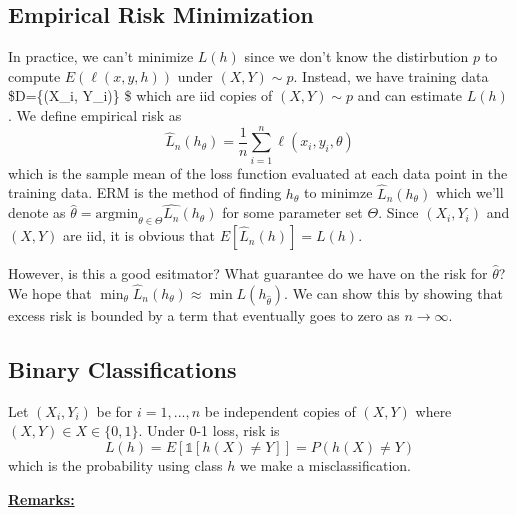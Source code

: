\documentclass[
]{article}
\begin{document}
\hypertarget{empirical-risk-minimization}{%
\subsection{Empirical Risk
Minimization}\label{empirical-risk-minimization}}

In practice, we can't minimize \(L(h)\) since we don't know the
distirbution \(p\) to compute \(E(\ell(x,y,h))\) under \((X,Y) \sim p\).
Instead, we have training data \$D=\{(X\_i, Y\_i)\} \$ which are iid
copies of \((X,Y)\sim p\) and can estimate \(L(h)\). We define empirical
risk as
\[\hat{L}_n (h _\theta) = \frac{1}{n} \sum_{i=1}^n \ell(x_i, y_i , \theta)\]
which is the sample mean of the loss function evaluated at each data
point in the training data. ERM is the method of finding \(h_\theta\) to
minimze \(\hat{L}_n (h _ \theta)\) which we'll denote as
\(\hat{\theta} = \text{argmin}_{\theta \in \Theta} \hat{L_n} (h_\theta)\)
for some parameter set \(\Theta\). Since \((X_i, Y_i)\) and \((X,Y)\)
are iid, it is obvious that \(E[\hat{L}_n (h)]=L(h)\).

However, is this a good esitmator? What guarantee do we have on the risk
for \(\hat{\theta}\)? We hope that
\(\min_\theta \hat{L}_n(h_\theta) \approx \min L(h_{\hat{\theta}})\). We
can show this by showing that excess risk is bounded by a term that
eventually goes to zero as \(n \to \infty\).

\hypertarget{binary-classifications}{%
\subsection{Binary Classifications}\label{binary-classifications}}

Let \((X_i, Y_i)\) be for \(i=1,...,n\) be independent copies of
\((X,Y)\) where \((X,Y) \in X \in \{0,1\}\). Under 0-1 loss, risk is
\[L(h)= E[ \mathbb{1}[h(X) \neq Y]]=P(h(X) \neq Y)\] which is the
probability using class \(h\) we make a misclassification.

\textbf{\underline{Remarks:}}
\end{document}
